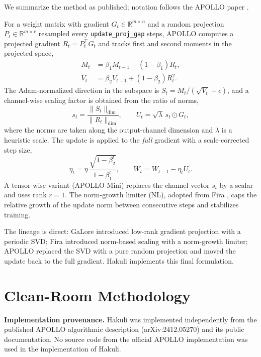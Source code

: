 \documentclass[11pt]{article}
\begin{document}
We summarize the method as published; notation follows the APOLLO paper
\citep{zhu2025apollo}.

For a weight matrix with gradient $G_t \in \mathbb{R}^{m \times n}$ and a
random projection $P_t \in \mathbb{R}^{m \times r}$ resampled every
\texttt{update\_proj\_gap} steps, APOLLO computes a projected gradient
$R_t = P_t^\top G_t$ and tracks first and second moments in the projected
space,
\begin{align}
  M_t &= \beta_1 M_{t-1} + (1-\beta_1) R_t, \\
  V_t &= \beta_2 V_{t-1} + (1-\beta_2) R_t^2 .
\end{align}
The Adam-normalized direction in the subspace is
$S_t = M_t / (\sqrt{V_t} + \epsilon)$, and a channel-wise scaling factor is
obtained from the ratio of norms,
\begin{equation}
  s_t = \frac{\lVert S_t \rVert_{\mathrm{dim}}}{\lVert R_t \rVert_{\mathrm{dim}}},
  \qquad
  U_t = \sqrt{\lambda}\, s_t \odot G_t,
\end{equation}
where the norms are taken along the output-channel dimension and $\lambda$ is
a heuristic scale. The update is applied to the \emph{full} gradient with a
scale-corrected step size,
\begin{equation}
  \eta_t = \eta \, \frac{\sqrt{1-\beta_2^t}}{1-\beta_1^t},
  \qquad
  W_t = W_{t-1} - \eta_t U_t .
\end{equation}
A tensor-wise variant (APOLLO-Mini) replaces the channel vector $s_t$ by a
scalar and uses rank $r=1$. The norm-growth limiter (NL), adopted from Fira
\citep{chen2025fira}, caps the relative growth of the update norm between
consecutive steps and stabilizes training.

The lineage is direct: GaLore introduced low-rank gradient projection with a
periodic SVD; Fira introduced norm-based scaling with a norm-growth limiter;
APOLLO replaced the SVD with a pure random projection and moved the update
back to the full gradient. Hakuli implements this final formulation.

\section{Clean-Room Methodology}
\label{sec:cleanroom}

\textbf{Implementation provenance.} Hakuli was implemented independently from
the published APOLLO algorithmic description (arXiv:2412.05270) and its
public documentation. No source code from the official APOLLO implementation
was used in the implementation of Hakuli.
\end{document}
